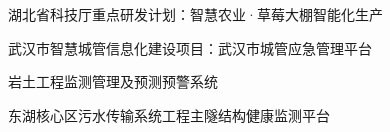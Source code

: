 
\item 湖北省科技厅重点研发计划：智慧农业·草莓大棚智能化生产
\item 武汉市智慧城管信息化建设项目：武汉市城管应急管理平台
\item 岩土工程监测管理及预测预警系统
\item 东湖核心区污水传输系统工程主隧结构健康监测平台